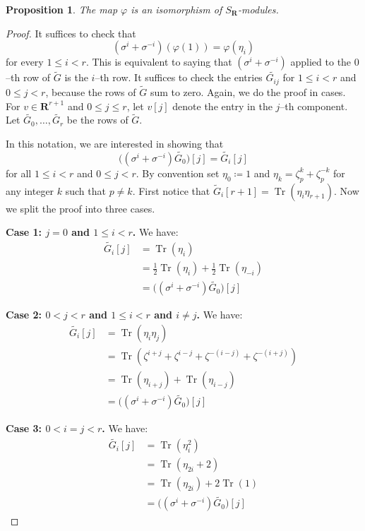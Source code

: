 \documentclass{amsart}
\newcommand{\RR}{\mathbf{R}}
\DeclareMathOperator{\Tr}{Tr}
\newtheorem{proposition}[theorem]{Proposition}
\numberwithin{equation}{section}
\begin{document}
\begin{proposition}
\label{p:equivariant}
The map $\varphi$ is an isomorphism of $S_{\RR}$-modules.
\end{proposition}
\begin{proof}
It suffices to check that 
\[
    (\sigma^i + \sigma^{-i})(\varphi(1)) = \varphi(\eta_i)
\]
for every $1 \leq i < r$.  This is equivalent to saying that $(\sigma^i + \sigma^{-i})$ applied to the $0$--th row of $\widetilde{G}$ is the $i$--th row. It suffices to check the entries $\widetilde{G_{ij}}$ for $1 \leq i < r$ and $0 \leq j < r$, because the rows of $\widetilde{G}$ sum to zero. Again, we do the proof in cases. For $v \in \RR^{r+1}$ and $0 \leq j \leq r$, let $v[j]$ denote the entry in the $j$--th component. Let $\widetilde{G_0},\dots,\widetilde{G_r}$ be the rows of $\widetilde{G}$. 

In this notation, we are interested in showing that
\[
    \bigg((\sigma^i + \sigma^{-i})\widetilde{G_0}\bigg)[j] = \widetilde{G_i}[j]
\]
for all $1 \leq i < r$ and $0 \leq j < r$. By convention set $\eta_0 \coloneqq 1$ and $\eta_k = \zeta_p^k + \zeta_p^{-k}$ for any integer $k$ such that $p \neq k$. First notice that $\widetilde{G}_i[r+1] = \Tr(\eta_i\eta_{r+1})$. Now we split the proof into three cases.

\noindent \textbf{Case 1: $j = 0$ and $1 \leq i < r$.} We have:
\begin{align*}
\widetilde{G_i}[j] &= \Tr(\eta_i) \\
&= \frac{1}{2}\Tr(\eta_i) + \frac{1}{2}\Tr(\eta_{-i}) \\
&= \bigg((\sigma^i + \sigma^{-i})\widetilde{G_0}\bigg)[j]
\end{align*}

\noindent \textbf{Case 2: $0 < j < r$ and $1 \leq i < r$ and $i \neq j$.} We have:
\begin{align*}
\widetilde{G_i}[j] &= \Tr(\eta_i \eta_j) \\
&= \Tr(\zeta^{i+j}+\zeta^{i-j}+\zeta^{-(i-j)}+\zeta^{-(i+j)}) \\
&= \Tr(\eta_{i + j}) + \Tr(\eta_{i - j}) \\
&= \bigg((\sigma^i + \sigma^{-i})\widetilde{G_0}\bigg)[j]
\end{align*}

\noindent \textbf{Case 3: $0 < i = j < r$.} We have:
\begin{align*}
\widetilde{G_i}[j] &= \Tr(\eta_i^2) \\
&= \Tr(\eta_{2i}+2) \\
&= \Tr(\eta_{2i}) + 2\Tr(1) \\
&= \bigg((\sigma^i + \sigma^{-i})\widetilde{G_0}\bigg)[j]
\end{align*}
\noindent
\end{proof}
\end{document}

